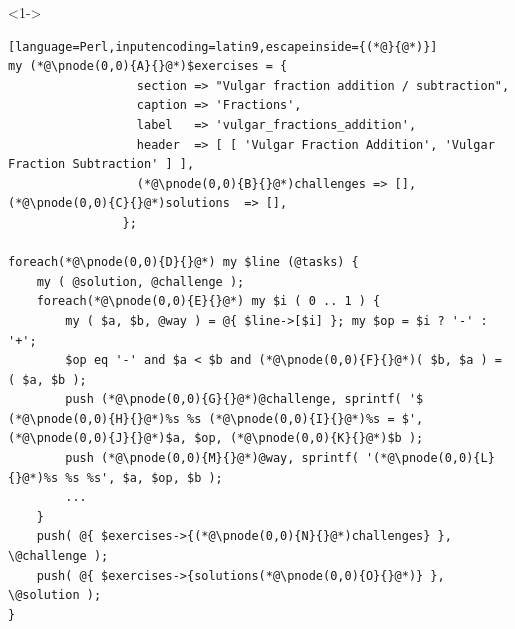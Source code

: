 \documentclass[ngerman,xcolor={table,dvipsnames},smaller,compress,hyperref={bookmarks,colorlinks}]{beamer}
\begin{document}
\begin{frame}[t,fragile]

\begin{block}<1->{}
\scriptsize
\begin{lstlisting}[language=Perl,inputencoding=latin9,escapeinside={(*@}{@*)}]
my (*@\pnode(0,0){A}{}@*)$exercises = {
                  section => "Vulgar fraction addition / subtraction",
                  caption => 'Fractions',
                  label   => 'vulgar_fractions_addition',
                  header  => [ [ 'Vulgar Fraction Addition', 'Vulgar Fraction Subtraction' ] ],
                  (*@\pnode(0,0){B}{}@*)challenges => [], (*@\pnode(0,0){C}{}@*)solutions  => [],
                };

foreach(*@\pnode(0,0){D}{}@*) my $line (@tasks) {
    my ( @solution, @challenge );
    foreach(*@\pnode(0,0){E}{}@*) my $i ( 0 .. 1 ) {
        my ( $a, $b, @way ) = @{ $line->[$i] }; my $op = $i ? '-' : '+';
        $op eq '-' and $a < $b and (*@\pnode(0,0){F}{}@*)( $b, $a ) = ( $a, $b );
        push (*@\pnode(0,0){G}{}@*)@challenge, sprintf( '$ (*@\pnode(0,0){H}{}@*)%s %s (*@\pnode(0,0){I}{}@*)%s = $', (*@\pnode(0,0){J}{}@*)$a, $op, (*@\pnode(0,0){K}{}@*)$b );
        push (*@\pnode(0,0){M}{}@*)@way, sprintf( '(*@\pnode(0,0){L}{}@*)%s %s %s', $a, $op, $b );
        ...
    }
    push( @{ $exercises->{(*@\pnode(0,0){N}{}@*)challenges} }, \@challenge );
    push( @{ $exercises->{solutions(*@\pnode(0,0){O}{}@*)} },  \@solution );
}
\end{lstlisting}
\end{block}

\begin{itemize}
\end{itemize}

\end{frame}
\end{document}
